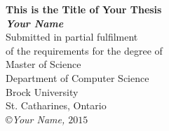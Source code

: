 \begin{titlepage}
\begin{center}

{\LARGE {\bf 
This is the Title of Your Thesis}}
\\[3cm]
{\large{ \bf \textit{Your Name}}}
\\[3cm]
{\large Submitted in partial fulfilment\\ of the requirements for the degree of\\ [1cm]
Master of Science}
\\[4cm]
{\large Department of Computer Science\\Brock University\\
St. Catharines, Ontario}
\\[5cm]
\copyright \textit{Your Name, $ 2015 $}

\end{center}
\end{titlepage}

